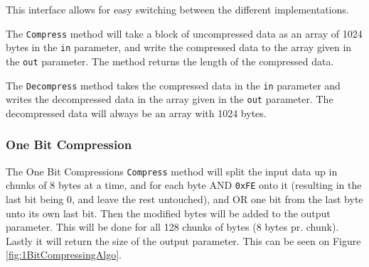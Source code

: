This interface allows for easy switching between the different implementations.

The \texttt{Compress} method will take a block of uncompressed data as an array of 1024 bytes in the \texttt{in} parameter, and write the compressed data to the array given in the \texttt{out} parameter. The method returns the length of the compressed data.

The \texttt{Decompress} method takes the compressed data in the \texttt{in} parameter and writes the decompressed data in the array given in the \texttt{out} parameter.
The decompressed data will always be an array with 1024 bytes.


\subsubsection{One Bit Compression}
The One Bit Compressions \texttt{Compress} method will split the input data up in chunks of 8 bytes at a time, and for each byte AND \texttt{0xFE} onto it (resulting in the last bit being 0, and leave the rest untouched), and OR one bit from the last byte unto its own last bit.
Then the modified bytes will be added to the output parameter.
This will be done for all 128 chunks of bytes (8 bytes pr. chunk).
Lastly it will return the size of the output parameter.
This can be seen on Figure \ref{fig:1BitCompressingAlgo}.

